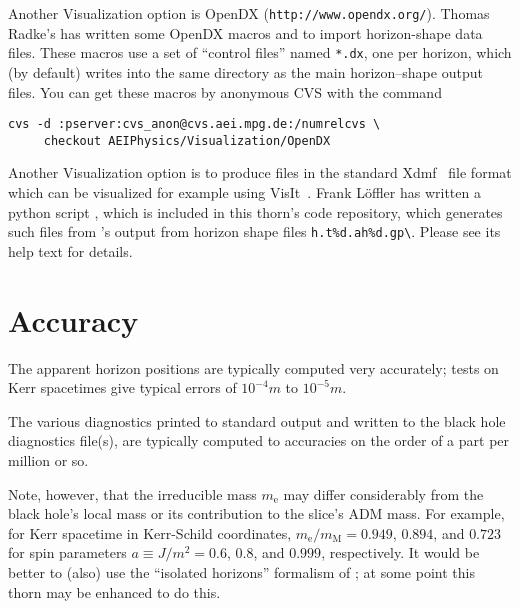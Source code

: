 Another Visualization option is OpenDX (\verb|http://www.opendx.org/|).
Thomas Radke's has written some OpenDX macros
and 
to import  horizon-shape data files.  
These macros use a set of ``control files'' named \verb|*.dx|,
one per horizon, which  (by default) writes
into the same directory as the main horizon--shape output files.
You can get these macros by anonymous CVS with the command
\begin{verbatim}
cvs -d :pserver:cvs_anon@cvs.aei.mpg.de:/numrelcvs \
     checkout AEIPhysics/Visualization/OpenDX
\end{verbatim}

Another Visualization option is to produce files in the standard
Xdmf~\cite{AHFinderDirect/Xdmf:web} file format which can be visualized for
example using VisIt~\cite{AHFinderDirect/VisIt:web}. Frank L\"offler has
written a python script \program{AH2xdmf.py}, which is included in this
thorn's code repository, which generates such files from
's output from horizon shape files
\verb|h.t%d.ah%d.gp\|. Please see its help text for details.


\section{Accuracy}

The apparent horizon positions are typically computed very accurately;
tests on Kerr spacetimes give typical errors of $10^{-4}m$ to $10^{-5}m$.

The various diagnostics printed to standard output and written to the
black hole diagnostics file(s), are typically computed to accuracies
on the order of a part per million or so.

Note, however, that the irreducible mass $m_{\text{e}}$
may differ considerably from the black hole's local mass or its
contribution to the slice's ADM mass.  For example, for Kerr spacetime
in Kerr-Schild coordinates,
$m_{\text{e}}/m_{\text{M}} = 0.949$, $0.894$, and $0.723$
for spin parameters $a \equiv J/m^2 = 0.6$, $0.8$, and $0.999$, respectively.
It would be better to (also) use the ``isolated horizons'' formalism of
\cite{AHFinderDirect/Dreyer-etal-2002-isolated-horizons};
at some point this thorn may be enhanced to do this.

